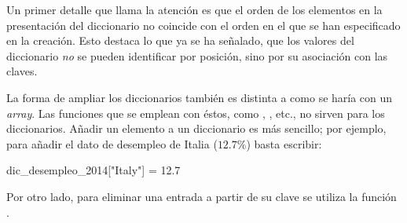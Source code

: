 Un primer detalle que llama la atención es que el orden de los elementos en la presentación del diccionario no coincide con el orden en el que se han especificado en la creación. Esto destaca lo que ya se ha señalado, que los valores del diccionario \emph{no} se pueden identificar por posición, sino por su asociación con las claves.

La forma de ampliar los diccionarios también es distinta a como se haría con un \emph{array}. Las funciones que se emplean con éstos, como , , etc., no sirven para los diccionarios. Añadir un elemento a un diccionario es más sencillo; por ejemplo, para añadir el dato de desempleo de Italia ($12.7\%$) basta escribir:

\begin{juliacode}
dic_desempleo_2014["Italy"] = 12.7
\end{juliacode}

Por otro lado, para eliminar una entrada a partir de su clave se utiliza la función . 

